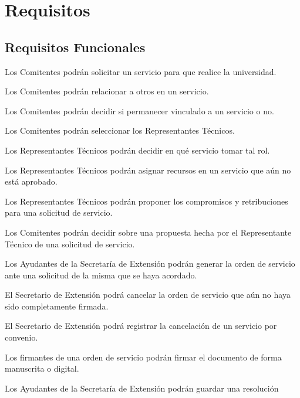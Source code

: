 \section{Requisitos}
\subsection[Funcionales]
	{Requisitos Funcionales}
\begin{enumerate}
	\hypertarget{RF-01}{%
	\item Los Comitentes podr\'an solicitar un
	servicio para que realice la universidad.}
	\hypertarget{RF-02}{%
	\item Los Comitentes podr\'an relacionar a
	otros en un servicio.}
	\hypertarget{RF-03}{%
	\item Los Comitentes podr\'an decidir si
	permanecer vinculado a un servicio o no.}
	\hypertarget{RF-04}{%
	\item Los Comitentes podr\'an seleccionar
	los Representantes T\'ecnicos.}
	\hypertarget{RF-05}{%
	\item Los Representantes T\'ecnicos podr\'an
	decidir en qu\'e servicio tomar tal rol.}
	\hypertarget{RF-06}{%
	\item Los Representantes T\'ecnicos podr\'an
	asignar recursos en un servicio que a\'un no
	est\'a aprobado.}
	\hypertarget{RF-07}{%
	\item Los Representantes T\'ecnicos podr\'an
	proponer los compromisos y retribuciones
	para una solicitud de servicio.}
	\hypertarget{RF-08}{%
	\item Los Comitentes podr\'an decidir sobre
	una propuesta hecha por el Representante
	T\'ecnico de una solicitud de servicio.}
	\hypertarget{RF-09}{%
	\item Los Ayudantes de la Secretar\'ia de
	Extensi\'on podr\'an generar la orden de
	servicio ante una solicitud de la misma que
	se haya acordado.}
	\hypertarget{RF-10}{%
	\item El Secretario de Extensi\'on podr\'a
	cancelar la orden de servicio que a\'un no
	haya sido completamente firmada.}
	\hypertarget{RF-11}{%
	\item El Secretario de Extensi\'on podr\'a
	registrar la cancelaci\'on de un servicio
	por convenio.}
	\hypertarget{RF-12}{%
	\item Los firmantes de una orden de servicio
	podr\'an firmar el documento de forma
	manuscrita o digital.}
	\hypertarget{RF-13}{%
	\item Los Ayudantes de la Secretar\'ia de
	Extensi\'on podr\'an guardar una resoluci\'on
}
\end{enumerate}
